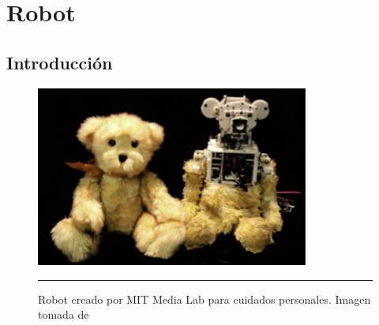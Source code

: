 


\chapter{Robot} %

\label{Chapter1} %




\section{Introducción}
\begin{figure}[htbp]
	\centering
		\includegraphics[width=0.8\textwidth]{./Figures/robot.jpg}
		\rule{35em}{0.5pt}
	\caption[Robot Huggable]{Robot creado por MIT Media Lab para cuidados personales. Imagen tomada de \cite{Stiehl:2006:HTR:1179133.1179149}}
	\label{fig:Huggable}
\end{figure}

